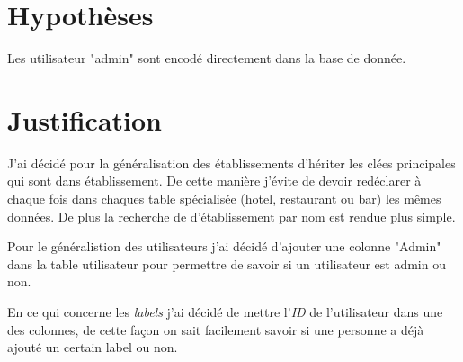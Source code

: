 \documentclass[a4paper,10pt]{article}
\begin{document}
\section{Hypothèses}

Les utilisateur "admin" sont encodé directement dans la base de donnée.

\section{Justification}

J'ai décidé pour la généralisation des établissements d'hériter les clées
principales qui sont dans établissement. De cette manière j'évite de devoir
redéclarer à chaque fois dans chaques table spécialisée (hotel, restaurant ou
bar) les mêmes données. De plus la recherche de d'établissement par nom est
rendue plus simple. \newline

Pour le généralistion des utilisateurs j'ai décidé d'ajouter une colonne
"Admin" dans la table utilisateur pour permettre de savoir si un utilisateur
est admin ou non. \newline

En ce qui concerne les \emph{labels} j'ai décidé de mettre l'\emph{ID} de
l'utilisateur dans une des colonnes, de cette façon on sait facilement savoir
si une personne a déjà ajouté un certain label ou non.
\end{document}
